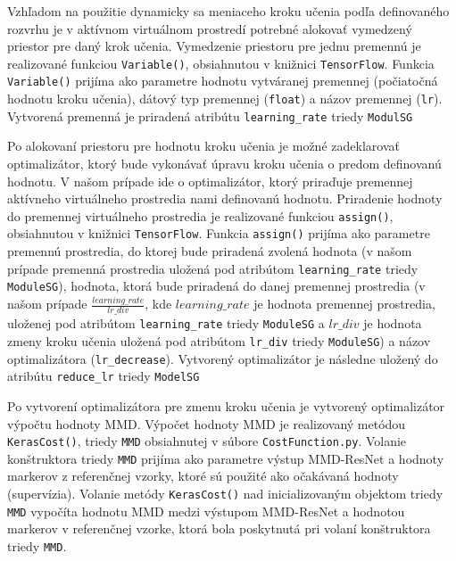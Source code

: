 Vzhľadom na použitie dynamicky sa meniaceho kroku učenia podľa definovaného rozvrhu je v aktívnom virtuálnom prostredí potrebné alokovať vymedzený priestor pre daný krok učenia. Vymedzenie priestoru pre jednu premennú je realizované funkciou \texttt{Variable()}, obsiahnutou v knižnici \texttt{TensorFlow}. Funkcia \texttt{Variable()} prijíma ako parametre hodnotu vytváranej premennej (počiatočná hodnotu kroku učenia), dátový typ premennej (\texttt{float}) a názov premennej (\texttt{lr}). Vytvorená premenná je priradená atribútu \texttt{learning_rate} triedy \texttt{ModulSG}

Po alokovaní priestoru pre hodnotu kroku učenia je možné zadeklarovať optimalizátor, ktorý bude vykonávať úpravu kroku učenia o predom definovanú hodnotu. V našom prípade ide o optimalizátor, ktorý priraďuje premennej aktívneho virtuálneho prostredia nami definovanú hodnotu. Priradenie hodnoty do premennej virtuálneho prostredia je realizované funkciou \texttt{assign()}, obsiahnutou v knižnici \texttt{TensorFlow}. Funkcia \texttt{assign()} prijíma ako parametre premennú prostredia, do ktorej bude priradená zvolená hodnota (v našom prípade premenná prostredia uložená pod atribútom \texttt{learning_rate} triedy \texttt{ModuleSG}), hodnota, ktorá bude priradená do danej premennej prostredia (v našom prípade $\frac{learning\_rate}{lr\_div}$, kde $learning\_rate$ je hodnota premennej prostredia, uloženej pod atribútom \texttt{learning_rate} triedy \texttt{ModuleSG} a $lr\_div$ je hodnota zmeny kroku učenia uložená pod atribútom \texttt{lr_div} triedy \texttt{ModuleSG}) a názov optimalizátora (\texttt{lr_decrease}). Vytvorený optimalizátor je následne uložený do atribútu \texttt{reduce_lr} triedy \texttt{ModelSG}

Po vytvorení optimalizátora pre zmenu kroku učenia je vytvorený optimalizátor výpočtu hodnoty MMD. Výpočet hodnoty MMD je realizovaný metódou \texttt{KerasCost()}, triedy \texttt{MMD} obsiahnutej v súbore \texttt{CostFunction.py}. Volanie konštruktora triedy \texttt{MMD} prijíma ako parametre výstup MMD-ResNet a hodnoty markerov z referenčnej vzorky, ktoré sú použité ako očakávaná hodnoty (supervízia). Volanie metódy \texttt{KerasCost()} nad inicializovaným objektom triedy \texttt{MMD} vypočíta hodnotu MMD medzi výstupom MMD-ResNet a hodnotou markerov v referenčnej vzorke, ktorá bola poskytnutá pri volaní konštruktora triedy \texttt{MMD}.

